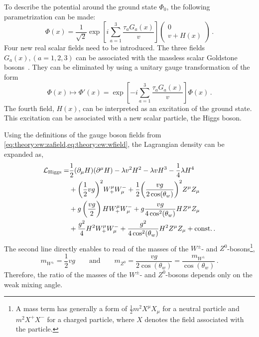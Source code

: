 To describe the potential around the ground state $\Phi_0$, the following parametrization can be made:
\begin{equation}
    \Phi(x) = \frac{1}{\sqrt{2}} \exp \left[ i \sum_{a=1}^{3} \frac{\tau_a G_a(x)}{v} \right]
    \begin{pmatrix}
         0 \\ v + H(x)
    \end{pmatrix} \,.
\end{equation}
Four new real scalar fields need to be introduced.
The three fields $G_a(x), (a=1,2,3)$ can be associated with the massless scalar Goldstone bosons~\cite{GoldstoneBoson1,GoldstoneBoson2}.
They can be eliminated by using a unitary gauge transformation of the form
\begin{equation}
    \Phi(x) \mapsto \Phi'(x) = \exp \left[ - i \sum_{a=1}^{3} \frac{\tau_a G_a(x)}{v} \right] \Phi(x) \,.
\end{equation}
The fourth field, $H(x)$, can be interpreted as an excitation of the ground state.
This excitation can be associated with a new scalar particle, the Higgs boson.

Using the definitions of the gauge boson fields from \cref{eq:theory:ew:zafield,eq:theory:ew:wfield}, the
Lagrangian density can be expanded as,
\begin{equation}
    \begin{split}
        \mathcal{L}_\text{Higgs} =& \frac{1}{2} (\partial_\mu H)(\partial^\mu H) - \lambda v^2 H^2 - \lambda v H^3 - \frac{1}{4} \lambda H^4 \\
        & + {\left(\frac{1}{2} v g \right)}^2 W^\mu_+ W^-_\mu + \frac{1}{2} {\left(\frac{v g}{2 \cos (\theta_w)}\right)}^2 Z^\mu Z_\mu \\
        & + g \left(\frac{v g }{2}\right) H W^\mu_+ W^-_\mu + g \frac{v g}{4 \cos^2 (\theta_w)} H Z^\mu Z_\mu \\
        & + \frac{g^2}{4} H^2 W^\mu_+ W^-_\mu + \frac{g^2}{4 \cos^2 (\theta_w)} H^2 Z^\mu Z_\mu + \text{const}.  \,.
    \end{split}
\end{equation}
The second line directly enables to read of the masses of the $W^\pm$- and $Z^0$-bosons\footnote{A mass term has generally a form of $\frac{1}{2}m^2 X^\mu X_\mu$ for a neutral particle
and $m^2 X^+ X^-$ for a charged particle, where $X$ denotes the field associated with the particle.},
\begin{equation}
    m_{W^\pm} = \frac{1}{2} v g \qquad \text{and} \qquad m_{Z^0} = \frac{v g }{2 \cos(\theta_w)} = \frac{m_{W^\pm}}{\cos(\theta_w)} \,.
\end{equation}
Therefore, the ratio of the masses of the $W^\pm$- and $Z^0$-bosons depends only on the weak mixing angle.

